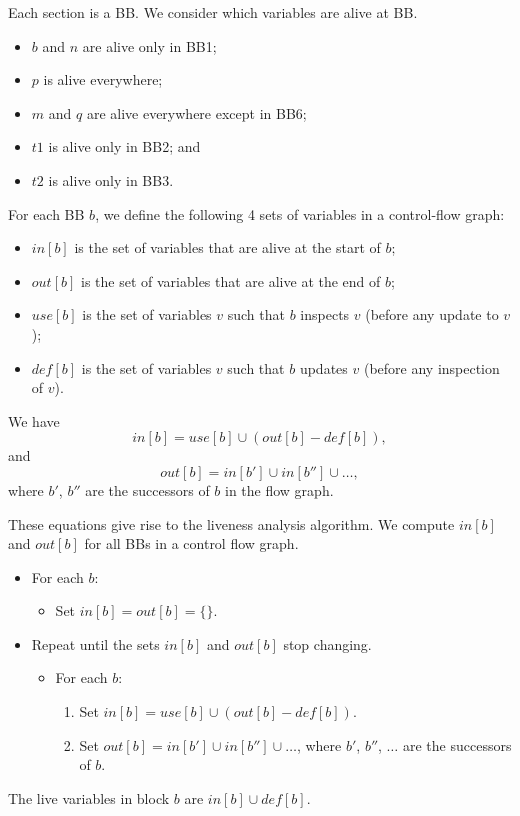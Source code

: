 \documentclass[a4paper, openany]{memoir}
\begin{document}
Each section is a BB. We consider which variables are alive at BB.
\begin{itemize}
    \item $b$ and $n$ are alive only in BB1;
    \item $p$ is alive everywhere;
    \item $m$ and $q$ are alive everywhere except in BB6;
    \item $t1$ is alive only in BB2; and
    \item $t2$ is alive only in BB3.
\end{itemize}

For each BB $b$, we define the following 4 sets of variables in a control-flow graph:
\begin{itemize}
    \item $in[b]$ is the set of variables that are alive at the start of $b$;
    \item $out[b]$ is the set of variables that are alive at the end of $b$;
    \item $use[b]$ is the set of variables $v$ such that $b$ inspects $v$ (before any update to $v$);
    \item $def[b]$ is the set of variables $v$ such that $b$ updates $v$ (before any inspection of $v$).
\end{itemize}
We have
\[in[b] = use[b] \cup (out[b] - def[b]),\]
and
\[out[b] = in[b'] \cup in[b''] \cup \dots,\]
where $b'$, $b''$ are the successors of $b$ in the flow graph.

These equations give rise to the liveness analysis algorithm. We compute $in[b]$ and $out[b]$ for all BBs in a control flow graph.
\begin{itemize}
    \item For each $b$:
    \begin{itemize}
        \item Set $in[b] = out[b] = \{\}$.
    \end{itemize}
    \item Repeat until the sets $in[b]$ and $out[b]$ stop changing.
    \begin{itemize}
        \item For each $b$:
        \begin{enumerate}
            \item Set $in[b] = use[b] \cup (out[b] - def[b])$.
            \item Set $out[b] = in[b'] \cup in[b''] \cup \dots$, where $b'$, $b''$, $\dots$ are the successors of $b$.
        \end{enumerate}
    \end{itemize}
\end{itemize}
The live variables in block $b$ are $in[b] \cup def[b]$.
\end{document}
